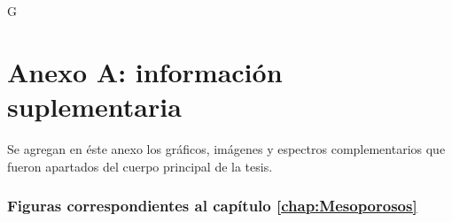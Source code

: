 G\cleardoublepage{}
{}
\FormatoAnexoA

\AddLabelsAxUno

\let\originalstyle=\thispagestyle            %
\def\thispagestyle#1{\fancyfoot[C]{}}       %
\def\thispagestyle#1{\originalstyle{empty}} %
\def\thispagestyle#1{}                       %

\renewcommand\thefigure{A.\arabic{figure}} 

\chapter*{Anexo A: información suplementaria}
    
    Se agregan en éste anexo los gráficos, imágenes y espectros complementarios que fueron apartados del cuerpo principal de la tesis. 

    \subsection*{Figuras correspondientes al capítulo \ref{chap:Mesoporosos}}


